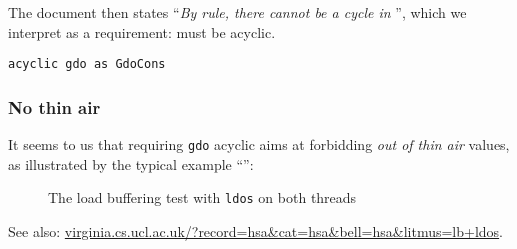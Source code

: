 \documentclass[a4paper]{article}
\begin{document}
The document then states
``\emph{By rule, there cannot be a cycle in \gdo{}}'', which we interpret as a
requirement: \gdo{} must be acyclic.

\begin{verbatim}
acyclic gdo as GdoCons
\end{verbatim}

\subsubsection{No thin air}

It seems to us that requiring {\tt gdo} acyclic aims at forbidding \emph{out of
thin air} values, as illustrated by the typical example ``'':
\begin{figure}[!h]
\begin{center}
\moveback{}
\end{center}
\caption{The load buffering test with {\tt ldos} on both threads
\color{red}{(Forbidden)}}
\end{figure}

See also:
\url{virginia.cs.ucl.ac.uk/?record=hsa&cat=hsa&bell=hsa&litmus=lb+ldos}.
\end{document}
